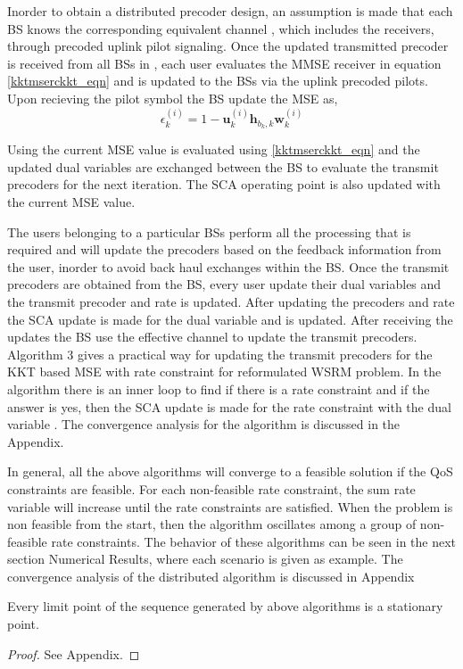 Inorder to obtain a distributed precoder design, an assumption is made that each \ac{BS}  knows the corresponding equivalent channel , which includes the receivers,  through precoded uplink pilot signaling. Once the updated transmitted precoder is received from all \ac{BS}s in , each user evaluates the \ac{MMSE} receiver in equation \eqref{kktmserckkt_eqn} and is updated to the \ac{BS}s via the uplink precoded pilots. Upon recieving the pilot symbol the \ac{BS} update the \ac{MSE} as,
\begin{equation}
\epsilon_k^{(i)} = 1 - \mathbf{u}_k^{(i)} \mathbf{h}_{{b_k},k} \mathbf{w}_k^{(i)}
\label{kktmserc5_eqn}
\end{equation}

Using the current \ac{MSE} value  is evaluated using \eqref{kktmserckkt_eqn} and the updated dual variables are exchanged between the \ac{BS} to evaluate the transmit precoders  for the next iteration. The \ac{SCA} operating point is also updated with the current \ac{MSE} value.

The users belonging to a particular \ac{BS}s perform all the processing that is required and will update the precoders based on the feedback information from the user, inorder to avoid back haul exchanges within the \ac{BS}. Once the transmit precoders are obtained from the \ac{BS}, every user update their dual variables  and the transmit precoder  and rate  is updated. After updating the precoders and rate the \ac{SCA} update is made for the dual variable  and is updated. After receiving the updates the \ac{BS} use the effective channel to update the transmit precoders. Algorithm 3 gives a practical way for updating the transmit precoders for the \ac{KKT} based MSE with rate constraint for reformulated \ac{WSRM} problem. In the algorithm there is an inner loop to find if there is a rate constraint and if the answer is yes, then the \ac{SCA} update is made for the rate constraint with the dual variable . The convergence analysis for the algorithm is discussed in the Appendix.

In general, all the above algorithms will converge to a feasible solution if the QoS constraints are feasible. For each non-feasible rate constraint, the sum rate variable  will increase until the rate constraints are satisfied. When the problem is non feasible from the start, then the algorithm oscillates among a group of non-feasible rate constraints. The behavior of these algorithms can be seen in the next section Numerical Results, where each scenario is given as example. The convergence analysis of the distributed algorithm is discussed in Appendix 

\newpage
\begin{theorem}
	Every limit point of the sequence generated by above algorithms is a stationary point.
\end{theorem}
\begin{proof}
	See Appendix.
\end{proof}	
